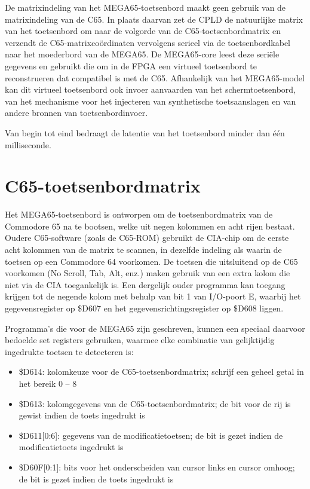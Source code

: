 De matrixindeling van het MEGA65-toetsenbord maakt geen gebruik van de matrixindeling van de C65. In plaats daarvan zet de CPLD de natuurlijke matrix van het toetsenbord om naar de volgorde van de C65-toetsenbordmatrix en verzendt de C65-matrixcoördinaten vervolgens serieel via de toetsenbordkabel naar het moederbord van de MEGA65. De MEGA65-core leest deze seriële gegevens en gebruikt die om in de FPGA een virtueel toetsenbord te reconstrueren dat compatibel is met de C65. Afhankelijk van het MEGA65-model kan dit virtueel toetsenbord ook invoer aanvaarden van het schermtoetsenbord, van het mechanisme voor het injecteren van synthetische toetsaanslagen en van andere bronnen van toetsenbordinvoer.

Van begin tot eind bedraagt de latentie van het toetsenbord minder dan één milliseconde.

\section{C65-toetsenbordmatrix}

Het MEGA65-toetsenbord is ontworpen om de toetsenbordmatrix van de Commodore 65 na te bootsen, welke uit negen kolommen en acht rijen bestaat. Oudere C65-software (zoals de C65-ROM) gebruikt de CIA-chip om de eerste acht kolommen van de matrix te scannen, in dezelfde indeling als waarin de toetsen op een Commodore 64 voorkomen. De toetsen die uitsluitend op de C65 voorkomen (No Scroll, Tab, Alt, enz.) maken gebruik van een extra kolom die niet via de CIA toegankelijk is. Een dergelijk ouder programma kan toegang krijgen tot de negende kolom met behulp van bit 1 van I/O-poort E, waarbij het gegevensregister op \$D607 en het gegevensrichtingsregister op \$D608 liggen.

Programma's die voor de MEGA65 zijn geschreven, kunnen een speciaal daarvoor bedoelde set registers gebruiken, waarmee elke combinatie van gelijktijdig ingedrukte toetsen te detecteren is:

\begin{itemize}
\item \$D614: kolomkeuze voor de C65-toetsenbordmatrix; schrijf een geheel getal in het bereik 0 -- 8\item \$D613: kolomgegevens van de C65-toetsenbordmatrix; de bit voor de rij is gewist indien de toets ingedrukt is\item \$D611[0:6]: gegevens van de modificatietoetsen; de bit is gezet indien de modificatietoets ingedrukt is\item \$D60F[0:1]: bits voor het onderscheiden van cursor links en cursor omhoog; de bit is gezet indien de toets ingedrukt is
\end{itemize}

